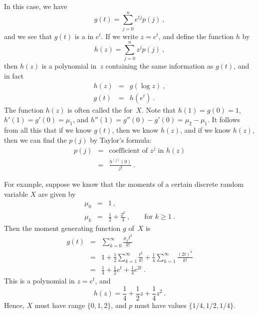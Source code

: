 In this case, we have
$$
g(t) = \sum_{j = 0}^n e^{tj} p(j)\ ,
$$
and we see that $g(t)$ is a  in $e^t$.  If we write $z =
e^t$, and define the function $h$ by
$$
h(z) = \sum_{j = 0}^n z^j p(j)\ ,
$$
then $h(z)$ is a polynomial in~$z$ containing the same information as $g(t)$,
and in fact
\begin{eqnarray*}
h(z) &=& g(\log z)\ , \\
g(t) &=& h(e^t)\ .
\end{eqnarray*}
The function $h(z)$ is often called the  for~$X$.  Note that $h(1) = g(0) =
1$,
$h'(1) = g'(0) =
\mu_1$, and
$h''(1) = g''(0) - g'(0) = \mu_2 - \mu_1$.  It follows from all this that if we know
$g(t)$, then we know $h(z)$, and if we know $h(z)$, then we can find the $p(j)$
by Taylor's formula:
\begin{eqnarray*}
p(j) &=& \mbox{coefficient~of}\,\, z^j \,\, \mbox{in}\,\, h(z) \\
     &=& \frac{h^{(j)}(0)}{j!}\ .
\end{eqnarray*}

For example, suppose we know that the moments of a certain discrete random
variable $X$ are given by
\begin{eqnarray*}
\mu_0 &=& 1\ , \\
\mu_k &=& \frac12 + \frac{2^k}4\ , \qquad \mbox{for}\,\, k \geq 1\ .
\end{eqnarray*}
Then the moment generating function $g$ of~$X$ is
\begin{eqnarray*}
g(t) &=& \sum_{k = 0}^\infty \frac{\mu_k t^k}{k!} \\
     &=& 1 + \frac12 \sum_{k = 1}^\infty \frac{t^k}{k!} + \frac14 \sum_{k =
1}^\infty \frac{(2t)^k}{k!} \\
     &=& \frac14 + \frac12 e^t + \frac14 e^{2t}\ .
\end{eqnarray*}
This is a polynomial in $z = e^t$, and
$$
h(z) = \frac14 + \frac12 z + \frac14 z^2\ .
$$
Hence, $X$ must have range $\{0,1,2\}$, and $p$ must have values
$\{1/4,1/2,1/4\}$.

